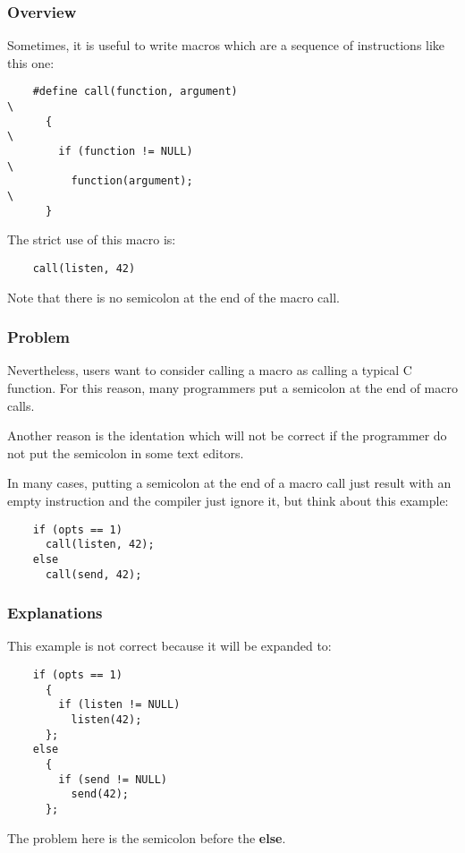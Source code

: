 
\begin{frame}[containsverbatim]
  \frametitle{Overview}

  Sometimes, it is useful to write macros which are a sequence of
  instructions like this one:

  \begin{verbatim}
    #define call(function, argument)                                    \
      {                                                                 \
        if (function != NULL)                                           \
          function(argument);                                           \
      }
  \end{verbatim}

  The strict use of this macro is:

  \begin{verbatim}
    call(listen, 42)
  \end{verbatim}

  Note that there is no semicolon at the end of the macro call.
\end{frame}


\begin{frame}[containsverbatim]
  \frametitle{Problem}

  Nevertheless, users want to consider calling a macro as calling a
  typical C function. For this reason, many programmers put a semicolon
  at the end of macro calls.

  \nl

  Another reason is the identation which will not be correct if the
  programmer do not put the semicolon in some text editors.

  \nl

  In many cases, putting a semicolon at the end of a macro call
  just result with an empty instruction and the compiler just ignore it,
  but think about this example:

  \begin{verbatim}
    if (opts == 1)
      call(listen, 42);
    else
      call(send, 42);
  \end{verbatim}
\end{frame}


\begin{frame}[containsverbatim]
  \frametitle{Explanations}

  This example is \alert{not} correct because it will be expanded to:

  \begin{verbatim}
    if (opts == 1)
      {
        if (listen != NULL)
          listen(42);
      };
    else
      {
        if (send != NULL)
          send(42);
      };
  \end{verbatim}

  The problem here is the semicolon before the \textbf{else}.
\end{frame}


